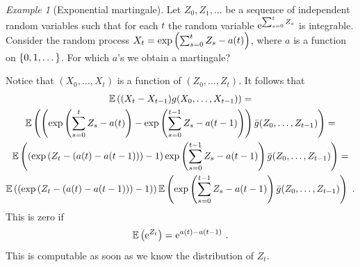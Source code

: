 \documentclass[12pt,a4paper]{amsart}
\theoremstyle{plain}%
\theoremstyle{definition}
\theoremstyle{remark}
\newtheorem{example}{Example}
\begin{document}
\begin{example}[Exponential martingale] Let $Z_0,Z_1,\dots$ be a
  sequence of independent random variables such that for each $t$ the
  random variable $\mathrm{e}^{\sum_{s=0}^tZ_s}$ is integrable. Consider the random
  process $X_t = \exp\left(\sum_{s=0}^t Z_s - a(t)\right)$, where $a$ is a
  function on $\left\{0,1,\dots\right\}$. For which $a$'s we obtain a
  martingale?

  Notice that $(X_0,\dots,X_t)$ is a function of $(Z_0,\dots,Z_t)$. It
  follows that
  \begin{multline*}
    \operatorname{\mathbb E}\left((X_{t} - X_{t-1}) g(X_0,\dots,X_{t-1})\right) = \\
\operatorname{\mathbb E}\left(\left(\exp\left(\sum_{s=0}^t Z_s - a(t)\right) - \exp\left(\sum_{s=0}^{t-1}
    Z_s - a(t-1)\right)\right) \bar g(Z_0,\dots,Z_{t-1})\right) = \\
\operatorname{\mathbb E}\left(\left(\exp\left(Z_t - (a(t)-a(t-1))\right) - 1\right)\exp\left(\sum_{s=0}^{t-1}
    Z_s - a(t-1)\right) \bar g(Z_0,\dots,Z_{t-1})\right) = \\
\operatorname{\mathbb E}\left(\left(\exp\left(Z_t - (a(t)-a(t-1))\right) - 1\right)\right) \operatorname{\mathbb E}\left(\exp\left(\sum_{s=0}^{t-1}
    Z_s - a(t-1)\right) \bar g(Z_0,\dots,Z_{t-1})\right) \ .
  \end{multline*}
This is zero if
\begin{equation*}
  \operatorname{\mathbb E}\left(\mathrm{e}^{Z_t} \right)= \mathrm{e}^{a(t) - a(t-1)} \ .
\end{equation*}
This is computable as soon as we know the distribution of $Z_t$.
\end{example}
\end{document}
